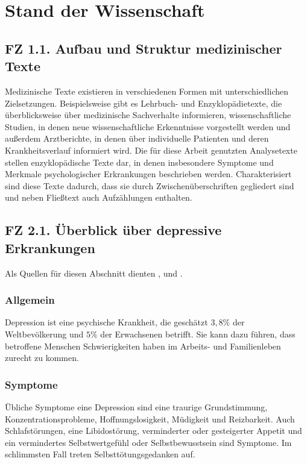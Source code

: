 \chapter{Stand der Wissenschaft}
\label{ch:standderwissenschaft} 


%
%
\section{FZ 1.1. Aufbau und Struktur medizinischer Texte}
\label{sec:fz1.1.} 

Medizinische Texte existieren in verschiedenen Formen mit unterschiedlichen Zielsetzungen. Beispielsweise gibt es Lehrbuch- und Enzyklopädietexte, die überblicksweise über medizinische Sachverhalte informieren, wissenschaftliche Studien, in denen neue wissenschaftliche Erkenntnisse vorgestellt werden und außerdem Arztberichte, in denen über individuelle Patienten und deren Krankheitsverlauf informiert wird.
Die für diese Arbeit genutzten Analysetexte stellen enzyklopädische Texte dar, in denen insbesondere Symptome und Merkmale psychologischer Erkrankungen beschrieben werden.
Charakterisiert sind diese Texte dadurch, dass sie durch Zwischenüberschriften gegliedert sind und neben Fließtext auch Aufzählungen enthalten.


%
%
\section{FZ 2.1. Überblick über depressive Erkrankungen}
\label{sec:fz2.1.} 
Als Quellen für diesen Abschnitt dienten \cite{mpg_depression}, \cite{who_depression} und \cite{psychrembel_depression}.
\subsection{Allgemein}
Depression ist eine psychische Krankheit, die geschätzt $3,8 \%$ der Weltbevölkerung und $5\%$ der Erwachsenen betrifft.
Sie kann dazu führen, dass betroffene Menschen Schwierigkeiten haben im Arbeits- und Familienleben zurecht zu kommen.

\subsection{Symptome}
Übliche Symptome eine Depression sind eine traurige Grundstimmung, Konzentrationsprobleme, Hoffnungslosigkeit, Müdigkeit und Reizbarkeit. Auch Schlafstörungen, eine Libidostörung, verminderter oder gesteigerter Appetit und ein vermindertes Selbstwertgefühl oder Selbstbewusstsein sind Symptome. Im schlimmsten Fall treten Selbsttötungsgedanken auf.

